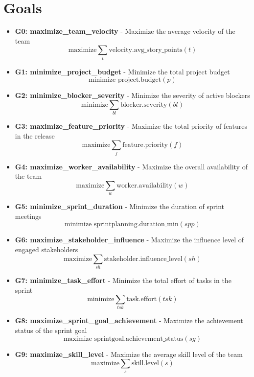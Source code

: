 \documentclass[11pt]{article}
\begin{document}
\section{Goals}
\begin{itemize}
    \item \textbf{G0: maximize\_team\_velocity} - Maximize the average velocity of the team
          \[ \text{maximize} \sum_{t} \text{velocity.avg\_story\_points}(t) \]
    \item \textbf{G1: minimize\_project\_budget} - Minimize the total project budget
          \[ \text{minimize } \text{project.budget}(p) \]
    \item \textbf{G2: minimize\_blocker\_severity} - Minimize the severity of active blockers
          \[ \text{minimize} \sum_{bl} \text{blocker.severity}(bl) \]
    \item \textbf{G3: maximize\_feature\_priority} - Maximize the total priority of features in the release
          \[ \text{maximize} \sum_{f} \text{feature.priority}(f) \]
    \item \textbf{G4: maximize\_worker\_availability} - Maximize the overall availability of the team
          \[ \text{maximize} \sum_{w} \text{worker.availability}(w) \]
    \item \textbf{G5: minimize\_sprint\_duration} - Minimize the duration of sprint meetings
          \[ \text{minimize } \text{sprintplanning.duration\_min}(spp) \]
    \item \textbf{G6: maximize\_stakeholder\_influence} - Maximize the influence level of engaged stakeholders
          \[ \text{maximize} \sum_{sh} \text{stakeholder.influence\_level}(sh) \]
    \item \textbf{G7: minimize\_task\_effort} - Minimize the total effort of tasks in the sprint
          \[ \text{minimize} \sum_{tsk} \text{task.effort}(tsk) \]
    \item \textbf{G8: maximize\_sprint\_goal\_achievement} - Maximize the achievement status of the sprint goal
          \[ \text{maximize } \text{sprintgoal.achievement\_status}(sg) \]
    \item \textbf{G9: maximize\_skill\_level} - Maximize the average skill level of the team
          \[ \text{maximize} \sum_{s} \text{skill.level}(s) \]
\end{itemize}
\end{document}
